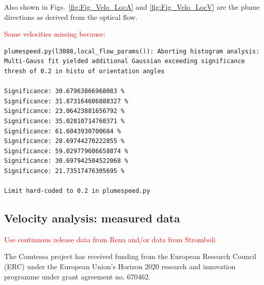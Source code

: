 \documentclass[amtd, manuscript]{copernicus}
\begin{document}
Also shown in Figs.~\ref{fig:Fig_Velo_LocA} and
\ref{fig:Fig_Velo_LocV} are the plume directions as derived from the
optical flow.

\textcolor{red}{
  Some velocities missing because:
  }
\begin{Verbatim}
plumespeed.py(l3088,local_flow_params()): Aborting histogram analysis:
Multi-Gauss fit yielded additional Gaussian exceeding significance
thresh of 0.2 in histo of orientation angles

Significance: 30.67963866968083 %
Significance: 31.873164606888327 %
Significance: 23.06423881656792 %
Significance: 35.02810714760371 %
Significance: 61.6043930700684 %
Significance: 28.69744270222855 %
Significance: 59.029779606658074 %
Significance: 30.697942504522068 %
Significance: 21.73517476305695 %

Limit hard-coded to 0.2 in plumespeed.py

\end{Verbatim}



\subsection{Velocity analysis: measured data}
\textcolor{red}{Use continuous release data from Rena and/or data from
Stromboli}

\conclusions  %
\label{sec:conclusions}






\begin{acknowledgements}
  The Comtessa project has received funding from the European Research
  Council (ERC) under the European Union's Horizon 2020 research and
  innovation programme under grant agreement no. 670462.
\end{acknowledgements}



\end{document}
